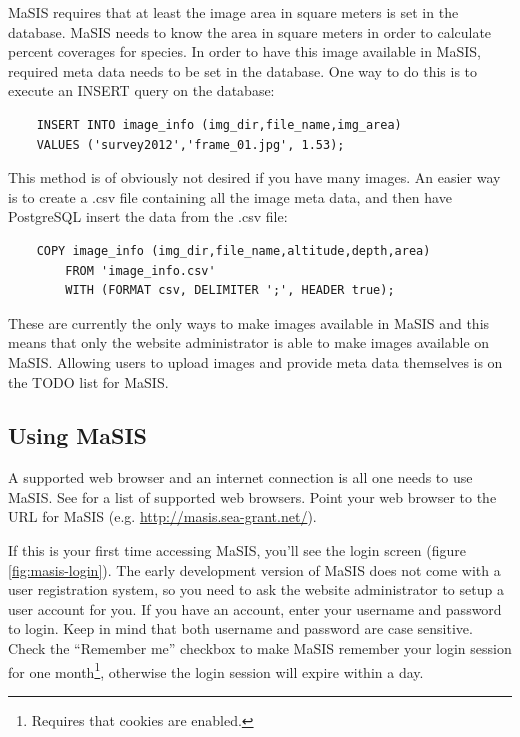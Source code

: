 \documentclass[twoside,a4paper]{refart}
\begin{document}
MaSIS requires that at least the image area in square meters is set in the database. MaSIS needs to know the area in square meters in order to calculate percent coverages for species. In order to have this image available in MaSIS, required meta data needs to be set in the database. One way to do this is to execute an INSERT query on the database:

\begin{verbatim}
    INSERT INTO image_info (img_dir,file_name,img_area)
    VALUES ('survey2012','frame_01.jpg', 1.53);
\end{verbatim}

This method is of obviously not desired if you have many images. An easier way is to create a .csv file containing all the image meta data, and then have PostgreSQL insert the data from the .csv file:

\begin{verbatim}
    COPY image_info (img_dir,file_name,altitude,depth,area)
        FROM 'image_info.csv'
        WITH (FORMAT csv, DELIMITER ';', HEADER true);
\end{verbatim}

These are currently the only ways to make images available in MaSIS and this means that only the website administrator is able to make images available on MaSIS. Allowing users to upload images and provide meta data themselves is on the TODO list for MaSIS.

\subsection{Using MaSIS}
\label{Using MaSIS}

A supported web browser and an internet connection is all one needs to use MaSIS. See  for a list of supported web browsers. Point your web browser to the URL for MaSIS (e.g. \url{http://masis.sea-grant.net/}).

If this is your first time accessing MaSIS, you'll see the login screen (figure \ref{fig:masis-login}). The early development version of MaSIS does not come with a user registration system, so you need to ask the website administrator to setup a user account for you. If you have an account, enter your username and password to login. Keep in mind that both username and password are case sensitive. Check the ``Remember me'' checkbox to make MaSIS remember your login session for one month\footnote{Requires that cookies are enabled.}, otherwise the login session will expire within a day.
\end{document}
